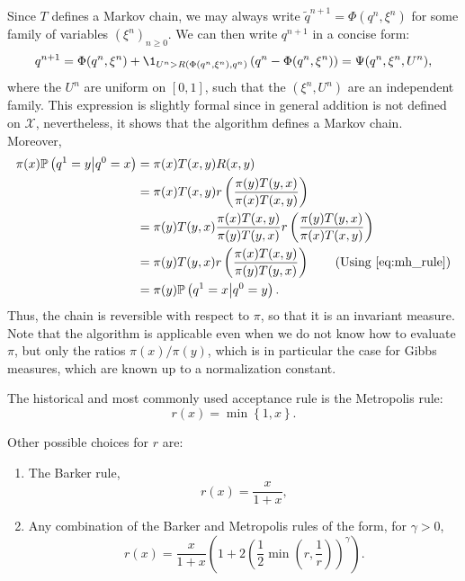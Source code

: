     Since $T$ defines a Markov chain, we may always write $\tilde q^{n+1}=\Phi(q^n,\xi^n)$ for some family of \iid variables $(\xi^n)_{n\geq 0}$. We can then write $q^{n+1}$ in a concise form:
    \begin{equation}
        \label{eq:metropolis_hastings_algorithm}
        q^{n+1}=\Phi(q^n,\xi^n)+\1_{U^n>R\left(\Phi(q^n,\xi^n),q^n\right)}\left(q^n-\Phi(q^n,\xi^n)\right)=\Psi(q^n,\xi^n,U^n),
    \end{equation}
    where the $U^n$ are \iid uniform on $[0,1]$, such that the $(\xi^n,U^n)$ are an independent family. This expression is slightly formal since in general addition is not defined on $\mathcal X$, nevertheless, it shows that the algorithm defines a Markov chain. Moreover,
    \begin{equation}
        \begin{aligned}
            \pi(x)\mathbb P\left(q^1=y \middle| q^0=x\right)&=\pi(x)T(x,y)R(x,y)\\
            &=\pi(x)T(x,y)r\left(\frac{\pi(y)T(y,x)}{\pi(x)T(x,y)}\right)\\
            &=\pi(y)T(y,x)\frac{\pi(x)T(x,y)}{\pi(y)T(y,x)}r\left(\frac{\pi(y)T(y,x)}{\pi(x)T(x,y)}\right)\\
            &=\pi(y)T(y,x)r\left(\frac{\pi(x)T(x,y)}{\pi(y)T(y,x)}\right)\qquad\text{(Using \eqref{eq:mh_rule})}\\
            &=\pi(y)\mathbb P\left(q^1=x\middle|q^0=y\right).
        \end{aligned}
    \end{equation}
    Thus, the chain is reversible with respect to $\pi$, so that it is an invariant measure.
    Note that the algorithm is applicable even when we do not know how to evaluate $\pi$, but only the ratios $\pi(x)/\pi(y)$, which is in particular the case for Gibbs measures, which are known up to a normalization constant.

    The historical and most commonly used acceptance rule is the Metropolis rule:
    \begin{equation}
        \label{eq:metropolis_rule}
        r(x)=\min\left\{1,x\right\}.
    \end{equation}

    \begin{remark}
        Other possible choices for $r$ are:
        \begin{enumerate}
            \item The Barker rule, \[r(x)=\frac{x}{1+x},\]
            \item Any combination of the Barker and Metropolis rules of the form, for $\gamma>0$, \[r(x)=\frac{x}{1+x}\left(1+2\left(\frac12\min\left(r,\frac 1r\right)\right)^\gamma\right).\]
        \end{enumerate}
    \end{remark}

